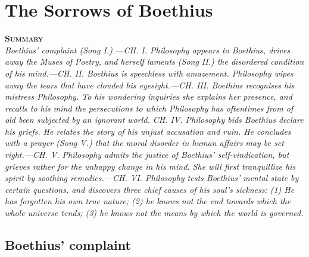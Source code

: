 \documentclass[12pt]{book}
\newenvironment{abstract}%
  {\noindent \textbf{\scshape Summary} \\ \rightskip1in\itshape\small}%
  {\bigskip}
\begin{document}
\mainmatter

\chapter{The Sorrows of Boethius}

\begin{abstract}
     Boethius' complaint (Song I.).---CH. I. Philosophy appears to
     Boethius, drives away the Muses of Poetry, and herself laments
     (Song II.) the disordered condition of his mind.---CH. II. Boethius
     is speechless with amazement. Philosophy wipes away the tears that
     have clouded his eyesight.---CH. III. Boethius recognises his
     mistress Philosophy. To his wondering inquiries she explains her
     presence, and recalls to his mind the persecutions to which
     Philosophy has oftentimes from of old been subjected by an ignorant
     world. CH. IV. Philosophy bids Boethius declare his griefs. He
     relates the story of his unjust accusation and ruin. He concludes
     with a prayer (Song V.) that the moral disorder in human affairs
     may be set right.---CH. V. Philosophy admits the justice of
     Boethius' self-vindication, but grieves rather for the unhappy
     change in his mind. She will first tranquillize his spirit by
     soothing remedies.---CH. VI. Philosophy tests Boethius' mental
     state by certain questions, and discovers three chief causes of his
     soul's sickness: (1) He has forgotten his own true nature; (2) he
     knows not the end towards which the whole universe tends; (3) he
     knows not the means by which the world is governed.
\end{abstract}

\section{Boethius' complaint}
\end{document}
